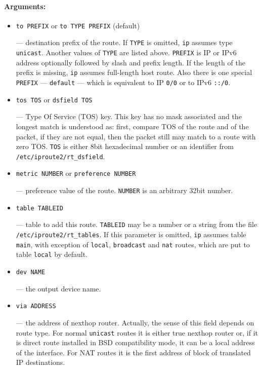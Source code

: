 \paragraph{Arguments:}
\begin{itemize}
\item \verb|to PREFIX| or \verb|to TYPE PREFIX| (default)

--- destination prefix of the route. If \verb|TYPE| is omitted,
\verb|ip| assumes type \verb|unicast|. Another values of \verb|TYPE|
are listed above. \verb|PREFIX| is IP or IPv6 address optionally followed
by slash and prefix length. If the length of the prefix is missing,
\verb|ip| assumes full-length host route. Also there is one special
\verb|PREFIX| --- \verb|default| --- which is equivalent to IP \verb|0/0| or
to IPv6 \verb|::/0|.

\item \verb|tos TOS| or \verb|dsfield TOS|

--- Type Of Service (TOS) key. This key has no mask associated and
the longest match is understood as: first, compare TOS
of the route and of the packet, if they are not equal, then the packet
still may match to a route with zero TOS. \verb|TOS| is either 8bit hexadecimal
number or an identifier from {\tt /etc/iproute2/rt\_dsfield}.


\item \verb|metric NUMBER| or \verb|preference NUMBER|

--- preference value of the route. \verb|NUMBER| is an arbitrary 32bit number.

\item \verb|table TABLEID|

--- table to add this route.
\verb|TABLEID| may be a number or a string from the file
\verb|/etc/iproute2/rt_tables|. If this parameter is omitted,
\verb|ip| assumes table \verb|main|, with exception of
\verb|local|, \verb|broadcast| and \verb|nat| routes, which are
put to table \verb|local| by default.

\item \verb|dev NAME|

--- the output device name.

\item \verb|via ADDRESS|

--- the address of nexthop router. Actually, the sense of this field depends
on route type. For normal \verb|unicast| routes it is either true nexthop
router or, if it is direct route installed in BSD compatibility mode,
it can be a local address of the interface.
For NAT routes it is the first address of block of translated IP destinations.


\end{itemize}
